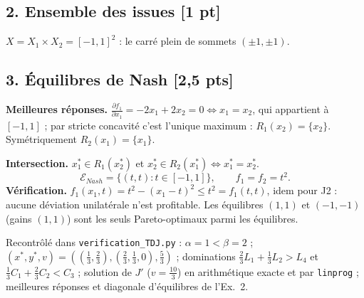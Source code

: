 \documentclass[11pt,a4paper]{article}
\begin{document}
\subsection*{2. Ensemble des issues \hfill[1 pt]}
$X=X_1\times X_2=[-1,1]^2$ : le carré plein de sommets $(\pm1,\pm1)$.
\begin{center}
\end{center}

\subsection*{3. Équilibres de Nash \hfill[2,5 pts]}
\textbf{Meilleures réponses.} $\frac{\partial f_1}{\partial x_1}=-2x_1+2x_2=0\iff x_1=x_2$, qui appartient à $[-1,1]$ ; par stricte concavité c'est l'unique maximum : $R_1(x_2)=\{x_2\}$. Symétriquement $R_2(x_1)=\{x_1\}$.

\textbf{Intersection.} $x_1^*\in R_1(x_2^*)$ et $x_2^*\in R_2(x_1^*)\iff x_1^*=x_2^*$.
\[
\boxed{\mathcal{E}_{Nash}=\{(t,t):t\in[-1,1]\},\qquad f_1=f_2=t^2.}
\]
\textbf{Vérification.} $f_1(x_1,t)=t^2-(x_1-t)^2\le t^2=f_1(t,t)$, idem pour J2 : aucune déviation unilatérale n'est profitable. Les équilibres $(1,1)$ et $(-1,-1)$ (gains $(1,1)$) sont les seuls Pareto-optimaux parmi les équilibres.

\vspace{0.4cm}
\begin{verifbox}
Recontrôlé dans \texttt{verification\_TDJ.py} : $\alpha=1<\beta=2$ ; $(x^*,y^*,v)=((\frac13,\frac23),(\frac23,\frac13,0),\frac53)$ ; dominations $\frac23L_1+\frac13L_2>L_4$ et $\frac13C_1+\frac23C_2<C_3$ ; solution de $J'$ ($v=\frac{10}3$) en arithmétique exacte et par \texttt{linprog} ; meilleures réponses et diagonale d'équilibres de l'Ex.~2.
\end{verifbox}
\end{document}

